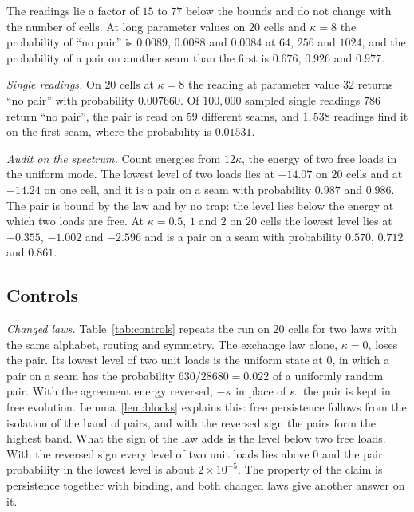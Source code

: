\documentclass[11pt]{article}
\theoremstyle{definition}
\theoremstyle{remark}
\theoremstyle{plain}
\begin{document}
The readings lie a factor of $15$ to $77$ below the bounds and do not
change with the number of cells. At long parameter values on $20$ cells
and $\kappa=8$ the probability of ``no pair'' is $0.0089$, $0.0088$ and
$0.0084$ at $64$, $256$ and $1024$, and the probability of a pair on
another seam than the first is $0.676$, $0.926$ and $0.977$.

\emph{Single readings.} On $20$ cells at $\kappa=8$ the reading at
parameter value $32$ returns ``no pair'' with probability $0.007660$. Of
$100{,}000$ sampled single readings $786$ return ``no pair'', the pair is
read on $59$ different seams, and $1{,}538$ readings find it on the first
seam, where the probability is $0.01531$.

\emph{Audit on the spectrum.} Count energies from $12\kappa$, the energy of
two free loads in the uniform mode. The lowest level of two loads lies at
$-14.07$ on $20$ cells and at $-14.24$ on one cell, and it is a pair on a
seam with probability $0.987$ and $0.986$. The pair is bound by the law and
by no trap: the level lies below the energy at which two loads are free. At
$\kappa=0.5$, $1$ and $2$ on $20$ cells the lowest level lies at $-0.355$,
$-1.002$ and $-2.596$ and is a pair on a seam with probability $0.570$,
$0.712$ and $0.861$.

\subsection{Controls}

\emph{Changed laws.} Table~\ref{tab:controls} repeats the run on $20$ cells
for two laws with the same alphabet, routing and symmetry. The exchange law
alone, $\kappa=0$, loses the pair. Its lowest level of two unit loads is
the uniform state at $0$, in which a pair on a seam has the probability
$630/28680=0.022$ of a uniformly random pair. With the agreement energy
reversed, $-\kappa$ in place of $\kappa$, the pair is kept in free
evolution. Lemma~\ref{lem:blocks} explains this: free persistence follows
from the isolation of the band of pairs, and with the reversed sign the
pairs form the highest band. What the sign of the law adds is the level
below two free loads. With the reversed sign every level of two unit loads
lies above $0$ and the pair probability in the lowest level is about
$2\times10^{-5}$. The property of the claim is
persistence together with binding, and both changed laws give another
answer on it.
\end{document}
